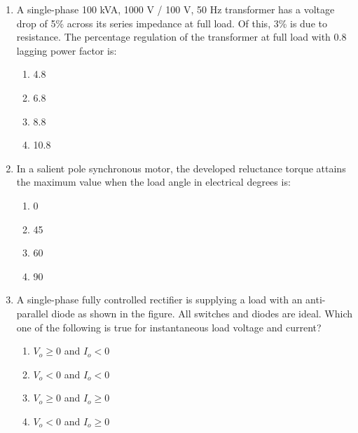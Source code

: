 \documentclass[journal,9pt,onecolumn]{IEEEtran}
\begin{document}
\begin{enumerate}
\item A single-phase 100 kVA, 1000 V / 100 V, 50 Hz transformer has a voltage drop of 5\% across its series impedance at full load. Of this, 3\% is due to resistance. The percentage regulation of the transformer at full load with 0.8 lagging power factor is:\hfill {}
\begin{multicols}{4}
    \begin{enumerate}
        \item 4.8
        \item 6.8
        \item 8.8
        \item 10.8
    \end{enumerate}
\end{multicols}


\item In a salient pole synchronous motor, the developed reluctance torque attains the maximum value when the load angle in electrical degrees is:\hfill {}
\begin{multicols}{4}
    \begin{enumerate}
    \item 0
    \item 45
    \item 60
    \item 90
    \end{enumerate}
\end{multicols}


\item A single-phase fully controlled rectifier is supplying a load with an anti-parallel diode as shown in the figure. All switches and diodes are ideal. Which one of the following is true for instantaneous load voltage and current?\hfill {}
\begin{center}
    
\end{center}
\begin{multicols}{4}
    \begin{enumerate}
        \item $V_o \geq 0$ and $I_o < 0$
        \item $V_o < 0$ and $I_o < 0$
        \item $V_o \geq 0$ and $I_o \geq 0$
        \item $V_o < 0$ and $I_o \geq 0$
    \end{enumerate}
\end{multicols}

\end{enumerate}
\end{document}
